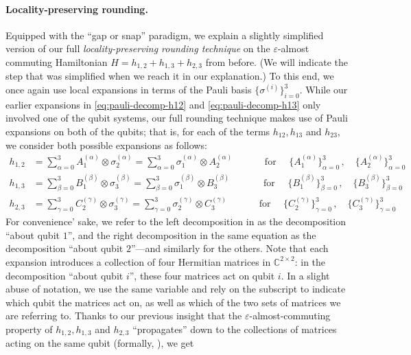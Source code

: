 \documentclass[11pt]{article}
\theoremstyle{plain}
\newcommand{\eps}{\varepsilon}
\begin{document}
\paragraph{Locality-preserving rounding.} 

Equipped with the ``gap or snap'' paradigm, we explain a slightly simplified version of our full \emph{locality-preserving rounding technique} on the $\eps$-almost commuting Hamiltonian $H = h_{1,2} + h_{1,3} + h_{2,3}$ from before. (We will indicate the step that was simplified when we reach it in our explanation.) 
To this end, we once again use local expansions in terms of the Pauli basis $\{\sigma^{(i)}\}_{i=0}^3$. While our earlier expansions in \eqref{eq:pauli-decomp-h12} and \eqref{eq:pauli-decomp-h13} only involved one of the qubit systems, our full rounding technique makes use of Pauli expansions on both of the qubits; that is, for each of the terms $h_{12}, h_{13}$ and $h_{23}$, we consider both possible expansions as follows:
\begin{align}
h_{1,2} &= \sum_{\alpha=0}^3 A^{(\alpha)}_1 \otimes \sigma_2^{(\alpha)} = \sum_{\alpha=0}^3 \sigma^{(\alpha)}_1 \otimes A_2^{(\alpha)}  \quad\quad\quad \text { for } \quad \{A_1^{(\alpha)}\}_{\alpha=0}^3\, , \quad \{A_2^{(\alpha)}\}_{\alpha=0}^3\quad\label{eq:pauli-decomp-h12-full}\\
h_{1,3} &= \sum_{\beta=0}^3 B^{(\beta)}_1 \otimes \sigma_3^{(\beta)} = \sum_{\beta=0}^3 \sigma^{(\beta)}_1 \otimes B_3^{(\beta)}   \quad\quad\quad \,\text { for } \quad \{B_1^{(\beta)}\}_{\beta=0}^3\, , \quad \{B_3^{(\beta)}\}_{\beta=0}^3\quad\label{eq:pauli-decomp-h13-full} 
\\h_{2,3} &= \sum_{\gamma=0}^3 C^{(\gamma)}_2 \otimes \sigma_3^{(\gamma)} = \sum_{\gamma=0}^3 \sigma^{(\gamma)}_2 \otimes C_3^{(\gamma)}   \quad\quad\,
\,\,\,\,\,\text { for } \quad \{C_2^{(\gamma)}\}_{\gamma=0}^3\, , \quad \{C_3^{(\gamma)}\}_{\gamma=0}^3 \quad\label{eq:pauli-decomp-h23-full}
\end{align}
For convenience' sake, we refer to the left decomposition in  as the decomposition ``about qubit $1$'', and the right decomposition in the same equation as the decomposition ``about qubit $2$''---and similarly for the others. Note that each expansion introduces a collection of four Hermitian matrices in $\mathbb{C}^{2 \times 2}$: in the decomposition ``about qubit $i$'', these four matrices act on qubit $i$. In a slight abuse of notation, we use the same variable and rely on the subscript to indicate which qubit the matrices act on, as well as which of the two sets of matrices we are referring to. Thanks to our previous insight that the $\eps$-almost-commuting property of $h_{1,2}, h_{1,3}$ and $h_{2,3}$ ``propagates'' down to the collections of matrices acting on the same qubit (formally, ), we get
\end{document}
